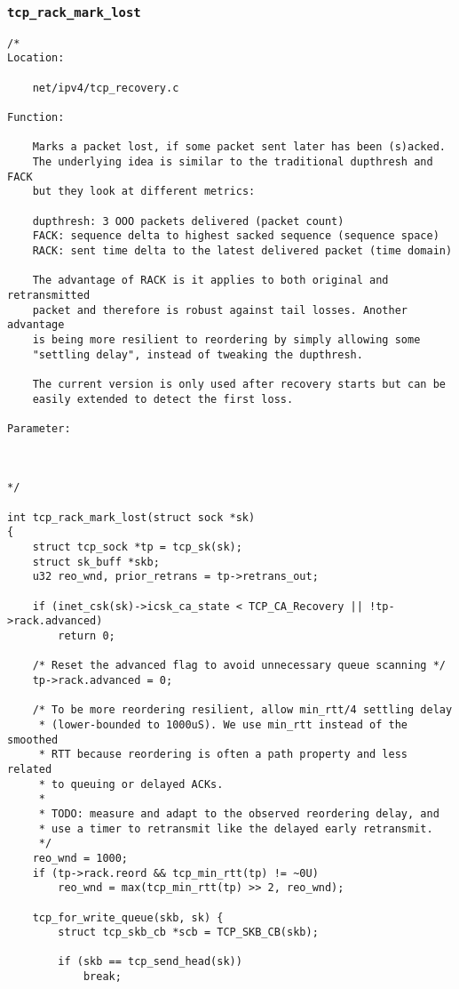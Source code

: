		\subsubsection{\texttt{tcp_rack_mark_lost}}
\begin{verbatim}
/*
Location:

	net/ipv4/tcp_recovery.c

Function:

	Marks a packet lost, if some packet sent later has been (s)acked.
	The underlying idea is similar to the traditional dupthresh and FACK
	but they look at different metrics:

	dupthresh: 3 OOO packets delivered (packet count)
	FACK: sequence delta to highest sacked sequence (sequence space)
	RACK: sent time delta to the latest delivered packet (time domain)

	The advantage of RACK is it applies to both original and retransmitted
	packet and therefore is robust against tail losses. Another advantage
	is being more resilient to reordering by simply allowing some
	"settling delay", instead of tweaking the dupthresh.

	The current version is only used after recovery starts but can be
	easily extended to detect the first loss.

Parameter:



*/

int tcp_rack_mark_lost(struct sock *sk)
{
	struct tcp_sock *tp = tcp_sk(sk);
	struct sk_buff *skb;
	u32 reo_wnd, prior_retrans = tp->retrans_out;

	if (inet_csk(sk)->icsk_ca_state < TCP_CA_Recovery || !tp->rack.advanced)
		return 0;

	/* Reset the advanced flag to avoid unnecessary queue scanning */
	tp->rack.advanced = 0;

	/* To be more reordering resilient, allow min_rtt/4 settling delay
	 * (lower-bounded to 1000uS). We use min_rtt instead of the smoothed
	 * RTT because reordering is often a path property and less related
	 * to queuing or delayed ACKs.
	 *
	 * TODO: measure and adapt to the observed reordering delay, and
	 * use a timer to retransmit like the delayed early retransmit.
	 */
	reo_wnd = 1000;
	if (tp->rack.reord && tcp_min_rtt(tp) != ~0U)
		reo_wnd = max(tcp_min_rtt(tp) >> 2, reo_wnd);

	tcp_for_write_queue(skb, sk) {
		struct tcp_skb_cb *scb = TCP_SKB_CB(skb);

		if (skb == tcp_send_head(sk))
			break;


\end{verbatim}
